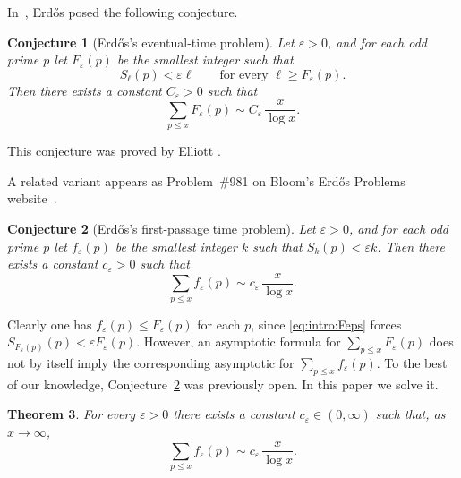 \documentclass[11pt,letterpaper,reqno]{amsart}
\newtheorem{theorem}{Theorem}[section]
\newtheorem{conjecture}[theorem]{Conjecture}
\theoremstyle{definition}
\numberwithin{equation}{section}
\newcommand{\1}{\mathbf{1}}
\begin{document}
In~\cite[Eq.~(80)]{Er65b}, Erd\H{o}s posed the following conjecture.

\begin{conjecture}[Erd\H{o}s's eventual-time problem]\label{conj:stronger}
Let $\varepsilon>0$, and for each odd prime $p$ let $F_\varepsilon(p)$ be the smallest integer such that
\begin{equation}\label{eq:intro:Feps}
S_\ell(p)<\varepsilon\ell\qquad\text{for every }\ell\ge F_\varepsilon(p).
\end{equation}
Then there exists a constant $C_\varepsilon>0$ such that
\[
\sum_{p \leq x}F_\varepsilon(p)\sim C_\varepsilon\,\frac{x}{\log x}.
\]
\end{conjecture}
This conjecture was proved by Elliott \cite{El69}.

A related variant appears as Problem~\#981 on Bloom's Erd\H{o}s Problems
website~\cite{EP981}.

\begin{conjecture}[Erd\H{o}s's first-passage time problem]\label{conj:weaker}
Let $\varepsilon>0$, and for each odd prime $p$ let $f_\varepsilon(p)$ be the smallest integer $k$ such that
$S_k(p)<\varepsilon k$. Then there exists a constant $c_\varepsilon>0$ such that
\[
\sum_{p \leq x}f_\varepsilon(p)\sim c_\varepsilon\,\frac{x}{\log x}.
\]
\end{conjecture}


Clearly one has $f_\varepsilon(p)\le F_\varepsilon(p)$ for each $p$, since \eqref{eq:intro:Feps} forces
$S_{F_\varepsilon(p)}(p)<\varepsilon F_\varepsilon(p)$.
However, an asymptotic formula for $\sum_{p\le x}F_\varepsilon(p)$ does not by itself imply the corresponding
asymptotic for $\sum_{p\le x}f_\varepsilon(p)$.
To the best of our knowledge, Conjecture~\ref{conj:weaker} was previously open.
In this paper we solve it.





\begin{theorem}\label{thm:intro:first}
For every $\varepsilon>0$ there exists a constant $c_\varepsilon\in(0,\infty)$ such that, as $x\to\infty$,
\[
\sum_{p\le x} f_\varepsilon(p)\sim c_\varepsilon\,\frac{x}{\log x}.
\]
\end{theorem}
\end{document}
